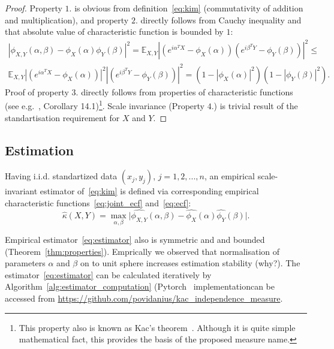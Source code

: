 \documentclass{article}
\begin{document}
\begin{proof}
Property $\textit{1.}$ is obvious from definition~\eqref{eq:kim} (commutativity of addition and multiplication), and property $\textit{2.}$ directly follows from Cauchy inequality and that absolute value of characteristic function is bounded by $1$:
\begin{multline*}
|\phi_{X,Y}(\alpha, \beta)  -\phi_{X}(\alpha) \phi_{Y}(\beta)|^{2} =
\mathbb{E}_{X,Y} |( e^{i\alpha^{T}X} - \phi_{X}(\alpha) )(e^{i\beta^{T}Y}- \phi_{Y}(\beta) )|^{2} \leq \\
\mathbb{E}_{X,Y} |( e^{i\alpha^{T}X} - \phi_{X}(\alpha) )|^{2} |(e^{i\beta^{T}Y}- \phi_{Y}(\beta) )|^{2}  = (1 - |\phi_{X}(\alpha)|^{2}) (1 - |\phi_{Y}(\beta)|^{2}).
\end{multline*}
Proof of property $\textit{3.}$ directly follows from properties of characteristic functions (see e.g.~\cite{Jacod}, Corollary 14.1)\footnote{This property also is known as Kac's theorem~\cite{KacTheorem}. Although it is quite simple mathematical fact, this provides the basis of the proposed measure name.}.
Scale invariance (Property $\textit{4.}$) is trivial result of the standartisation requirement for $X$ and $Y$.
\end{proof}

\subsection{Estimation}

Having i.i.d. standartized data $(x_{j}, y_{j})$, $j = 1,2,...,n$, an empirical scale-invariant estimator of~\eqref{eq:kim} is defined via corresponding empirical characteristic functions~\eqref{eq:joint_ecf} and~\eqref{eq:ecf}:
\begin{equation}
\label{eq:estimator}
    \hat{\kappa}(X,Y) = \max_{\alpha, \beta} \vert \widehat{\phi_{X,Y}}(\alpha,\beta)  - \widehat{\phi_{X}}(\alpha) \widehat{\phi_{Y}}(\beta) \vert.
\end{equation}

\noindent Empirical estimator~\eqref{eq:estimator} also is symmetric and and bounded (Theorem~\ref{thm:properties}). Emprically we observed that normalisation of parameters $\alpha$ and $\beta$ on to unit sphere increases estimation stability (why?). The  estimator~\eqref{eq:estimator} can be calculated iteratively by Algorithm~\ref{alg:estimator_computation} (Pytorch~\cite{NEURIPS2019_9015} implementationcan be accessed from \url{https://github.com/povidanius/kac_independence_measure}. 
\end{document}
